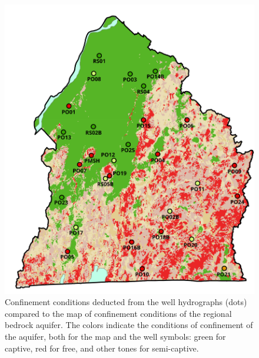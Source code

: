 \documentclass[WHATMANUAL.tex]{subfiles}
\begin{document}
\begin{figure}
\centering
\includegraphics[height=0.85\textheight]{img/CONFINEMENTetPUITS}
\caption[Confinement conditions deducted from the well hydrographs compared to the map of confinement conditions of the regional bedrock aquifer.]{Confinement conditions deducted from the well hydrographs (dots) compared to the map of confinement conditions of the regional bedrock aquifer. The colors indicate the conditions of confinement of the aquifer, both for the map and the well symbols: green for captive, red for free, and other tones for semi-captive.}
\label{fig:CONFINEMENTetPUITS}
\end{figure}

\newpage
\end{document}
